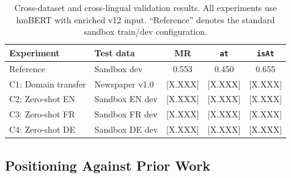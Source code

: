 \begin{table}[t]
\centering
\caption{Cross-dataset and cross-lingual validation results. All experiments use hmBERT with enriched v12 input. ``Reference'' denotes the standard sandbox train/dev configuration.}
\label{tab:crossval}
\begin{tabular}{llccc}
\toprule
\textbf{Experiment} & \textbf{Test data} & \textbf{MR} & \textbf{\texttt{at}} & \textbf{\texttt{isAt}} \\
\midrule
Reference & Sandbox dev & 0.553 & 0.450 & 0.655 \\
\midrule
C1: Domain transfer & Newspaper v1.0 & [X.XXX] & [X.XXX] & [X.XXX] \\
C2: Zero-shot EN & Sandbox EN dev & [X.XXX] & [X.XXX] & [X.XXX] \\
C3: Zero-shot FR & Sandbox FR dev & [X.XXX] & [X.XXX] & [X.XXX] \\
C4: Zero-shot DE & Sandbox DE dev & [X.XXX] & [X.XXX] & [X.XXX] \\
\bottomrule
\end{tabular}
\end{table}

%
%



\subsection{Positioning Against Prior Work}

